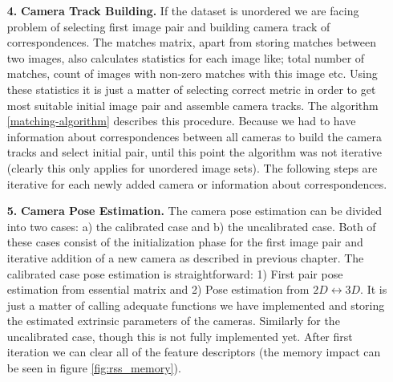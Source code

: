 \begin{itemize}
\begin{algorithm}[ht]
\begin{algorithmic}[1]
	\Statex
	\State Select initial pair of images $(i_1, i_2), 1 \leq i_1 \leq N, 1 \leq i_2 \leq N, i_1 \neq i_2$
	\State Add pair $(i_1, i_2)$ to \textbf{result}
	\State Add camera $i_1$, $i_2$ to list \textbf{todo}
				\State Add pair $(i, j)$ to \textbf{tmp\textunderscore result}
				\State Add camera $j$ to list \textbf{todo}
			\EndIf			
		\EndFor
		\State Sort \textbf{tmp\textunderscore result} descending by the number of matches.
		\State Add all new pairs from \textbf{tmp\textunderscore result} to \textbf{result}
		\State Clear \textbf{tmp\textunderscore result}
	\EndFor
\end{algorithmic}
\caption{Creating camera track}
\label{matching-algorithm}
\end{algorithm}

\item[\textbf{4.}] \textbf{Camera Track Building.}
If the dataset is unordered we are facing problem of selecting first image pair and building camera track of correspondences. The matches matrix, apart from storing matches between two images, also calculates statistics for each image like; total number of matches, count of images with non-zero matches with this image etc. Using these statistics it is just a matter of selecting correct metric in order to get most suitable initial image pair and assemble camera tracks. The algorithm \ref{matching-algorithm} describes this procedure. Because we had to have information about correspondences between all cameras to build the camera tracks and select initial pair, until this point the algorithm was not iterative (clearly this only applies for unordered image sets). The following steps are iterative for each newly added camera or information about correspondences. 

\item[\textbf{5.}] \textbf{Camera Pose Estimation.}
The camera pose estimation can be divided into two cases: a) the calibrated case and b) the uncalibrated case. Both of these cases consist of the initialization phase for the first image pair and iterative addition of a new camera as described in previous chapter. The calibrated case pose estimation is straightforward: 1) First pair pose estimation from essential matrix and 2) Pose estimation from $2D \leftrightarrow 3D$. It is just a matter of calling adequate functions we have implemented and storing the estimated extrinsic parameters of the cameras. Similarly for the uncalibrated case, though this is not fully implemented yet. After first iteration we can clear all of the feature descriptors (the memory impact can be seen in figure \ref{fig:rss_memory}).


\end{itemize}
